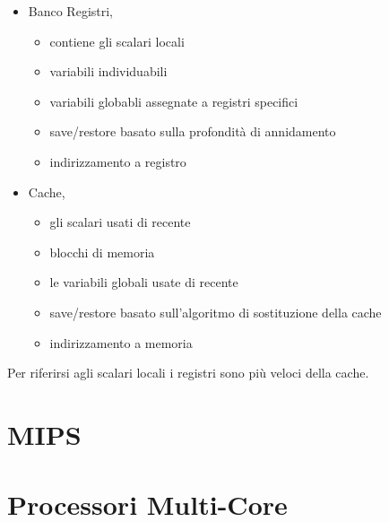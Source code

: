 \documentclass[arch.tex]{subfiles}
\begin{document}
\begin{itemize}
	\item Banco Registri,
		\begin{itemize}
			\item contiene  gli scalari locali
			\item variabili individuabili
			\item variabili globabli assegnate a registri specifici
			\item save/restore basato sulla profondità di annidamento
			\item indirizzamento a registro
		\end{itemize}
	\item Cache,
		\begin{itemize}
			\item {} gli scalari usati di recente
			\item blocchi di memoria
			\item {} le variabili globali usate di recente
			\item save/restore basato sull'algoritmo di sostituzione della cache
			\item indirizzamento a memoria
		\end{itemize}
\end{itemize}
Per riferirsi agli scalari locali i registri sono più veloci della cache.


\section{MIPS}%
\label{sec:mips}

\section{Processori Multi-Core}%
\label{sec:processori_multi_core}
\end{document}
